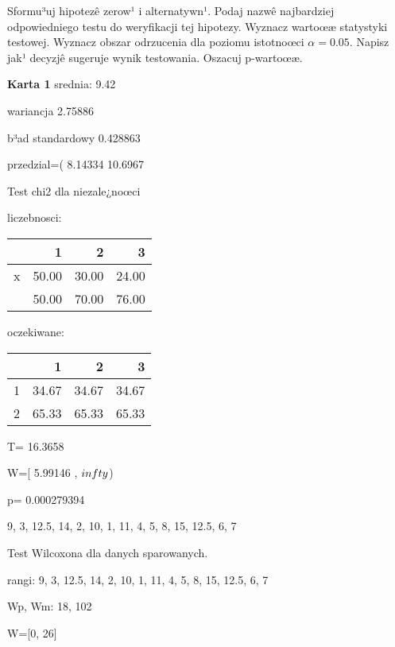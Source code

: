 \documentclass[a4paper,12pt]{article}
\begin{document}
     Sformu³uj hipotezê zerow¹ i alternatywn¹. 
     Podaj nazwê najbardziej odpowiedniego testu do weryfikacji tej hipotezy. 
     Wyznacz wartoœæ statystyki testowej. 
     Wyznacz obszar odrzucenia dla poziomu istotnoœci $\alpha=0.05$. 
     Napisz jak¹ decyzjê sugeruje wynik testowania. 
     Oszacuj p-wartoœæ. \vspace{1cm} 

  \clearpage \clearpage\begin{multicols}{3} \scriptsize \textbf{Karta  1 } 
 srednia: 9.42 
     
     wariancja 2.75886  
     
     b³ad standardowy 0.428863 
     
     przedzial=( 8.14334 10.6967 \vspace{1cm} 

  Test chi2 dla niezale¿noœci 
   
   liczebnosci: %
\begin{tabular}{rrrr}
  \hline
 & 1 & 2 & 3 \\
  \hline
x & 50.00 & 30.00 & 24.00 \\
   & 50.00 & 70.00 & 76.00 \\
   \hline
\end{tabular}
 
   
   oczekiwane: %
\begin{tabular}{rrrr}
  \hline
 & 1 & 2 & 3 \\
  \hline
1 & 34.67 & 34.67 & 34.67 \\
  2 & 65.33 & 65.33 & 65.33 \\
   \hline
\end{tabular}
 
   
   T= 16.3658 
   
   W=[ 5.99146 , $\\infty$) 
   
   p= 0.000279394 \vspace{1cm} 

  9, 3, 12.5, 14, 2, 10, 1, 11, 4, 5, 8, 15, 12.5, 6, 7 

  Test Wilcoxona dla danych sparowanych. 
  
  rangi: 9, 3, 12.5, 14, 2, 10, 1, 11, 4, 5, 8, 15, 12.5, 6, 7 
  
  Wp, Wm:  18,  102 
  
  W=[0, 26]  
  

\end{multicols}
\end{document}
